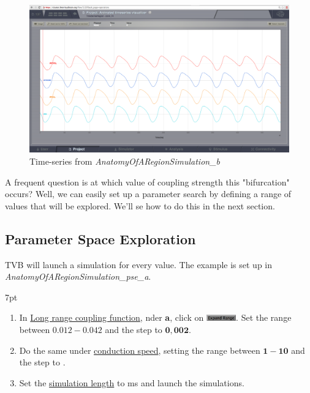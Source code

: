 \documentclass{tufte-handout}
\newenvironment{simulation}{%
  \def\FrameCommand{%
    \hspace{1pt}%
    {\color{ForestGreen}\vrule width 2pt}%
    {\color{simulationshade}\vrule width 4pt}%
    \colorbox{simulationshade}%
  }%
  \MakeFramed{\advance\hsize-\width\FrameRestore}%
  \noindent\hspace{-4.55pt}%
  \begin{adjustwidth}{}{7pt}%
  \vspace{2pt}\vspace{2pt}%
}
{%
  \vspace{2pt}\end{adjustwidth}\endMakeFramed%
}
\begin{document}
\begin{figure}[h]
  \includegraphics[width=\linewidth]{Handout_UI_BuildingYourOwnBrainNetworkModel_AnimatedTimeSeriesOscillatory}%
  \caption{Time-series from \textit{AnatomyOfARegionSimulation\_b}}%
  \label{fig:time_series_oscillatory}%
\end{figure}


A frequent question is at which value of coupling strength this
"bifurcation" occurs? Well, we can easily set up a parameter search by defining a
range of values that will be explored. We'll se how to do this in the next section.

 
\subsection{Parameter Space Exploration}\label{sec:results}

TVB will launch a simulation for
every value.  The example is set up in \textit{AnatomyOfARegionSimulation\_pse\_a}. 

\begin{simulation}
\begin{enumerate}
 \item In \underline{Long range coupling function}, nder \textbf{a}, click on \includegraphics[width=0.1\textwidth]{butt_expand_range.png}. 
 Set the range between $\mathbf{0.012-0.042}$ and the step to $\mathbf{0,002}$.
 \item Do the same under \underline{conduction speed}, setting the range between $\mathbf{1-10}$  and the step to \textbf{}.
 
 \item Set the \underline{simulation length} to \unit[2000]{ms} and launch the simulations.
\end{enumerate}
\end{simulation}
\end{document}
